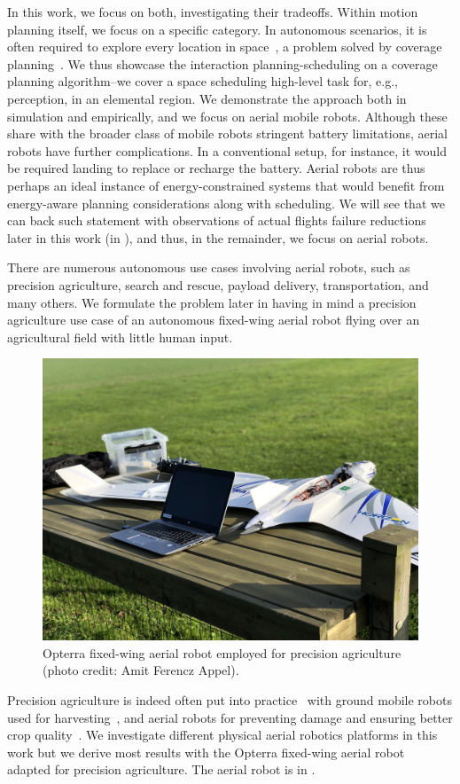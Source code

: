 In this work, we focus on both, investigating their tradeoffs. Within motion planning itself, we focus on a specific category. In autonomous scenarios, it is often required to explore every location in space~\citep{cao1988region}, a problem solved by coverage planning~\citep{choset2001coverage}. We thus showcase the interaction planning-scheduling on a coverage planning algorithm--we cover a space scheduling high-level task for, e.g., perception, in an elemental region. We demonstrate the approach both in simulation and empirically, and we focus on aerial mobile robots. Although these share with the broader class of mobile robots stringent battery limitations, aerial robots have further complications. In a conventional setup, for instance, it would be required landing to replace or recharge the battery. Aerial robots are thus perhaps an ideal instance of energy-constrained systems that would benefit from energy-aware planning considerations along with scheduling. We will see that we can back such statement with observations of actual flights failure reductions later in this work (in ), and thus,  in the remainder, we focus on aerial robots.

There are numerous autonomous use cases involving aerial robots, such as precision agriculture, search and rescue, payload delivery, transportation, and many others. We formulate the problem later in  having in mind a precision agriculture use case of an autonomous fixed-wing aerial robot flying over an agricultural field with little human input.
\begin{figure}[t]
  \centering
  \includegraphics[width=.7\textwidth]{pictures/photo}
  \caption[Opterra fixed-wing aerial robot]{Opterra fixed-wing aerial robot employed for precision agriculture {\scriptsize(photo credit: Amit Ferencz Appel)}.}
  \label{fig:opterra}
\end{figure}
Precision agriculture is indeed often put into practice~\citep{hajjaj2014review} with ground mobile robots used for harvesting~\citep{qingchun2012study,dong2011development, de2011design, aljanobi2010setup, li2008analysis, edan2000robotic}, and aerial robots for preventing damage and ensuring better crop quality~\citep{puri2017agriculture, daponte2019review}. We investigate different physical aerial robotics platforms in this work but we derive most results with the Opterra fixed-wing aerial robot~\citep{opterra} adapted for precision agriculture. The aerial robot is in .

